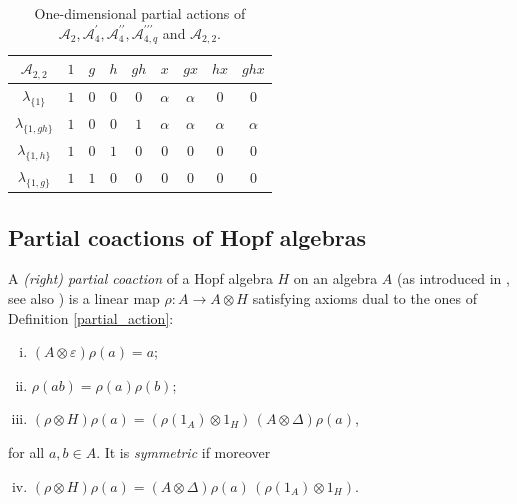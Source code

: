 \documentclass[reqno]{amsart}
\theoremstyle{definition}
\numberwithin{equation}{section}\theoremstyle{plain}
\theoremstyle{definition}
\begin{document}
\begin{center}
\begin{table}[!ht]
\vspace{0.2cm}           

\begin{tabular}{| c | c | c | c | c | c | c | c | c | }\hline
$\mathcal{A}_{2,2}$	& $1$ & $g$ & $h$ & $gh$ & $x$ & $gx$ & $hx$ & $ghx$	\\ \hline
$\lambda_{\{1\}}$ &  $1$ & $0$ & $0$  & $0$ & $\alpha$ & $\alpha$ & $0$ & $0$  \\ \hline
$\lambda_{\{1, gh\}}$ &  $1$ & $0$ & $0$ & $1$ & $\alpha$ &  $\alpha$ &  $\alpha$ &  $\alpha$ \\ \hline
$\lambda_{\{1, h\}}$ & $ 1$ & $0$ & $1$ & $0$ & $0$ & $0$ & $0$ & $0$  \\ \hline
$\lambda_{\{1, g\}}$ &  $1$ & $1$ & $0$ & $0$ & $0$ & $0$ & $0$ & $0$ \\ \hline    
\end{tabular}
            
\vspace{0.2cm}
            
\caption{One-dimensional partial actions of $\mathcal{A}_2, \mathcal{A}_4^\prime, \mathcal{A}_4^{\prime \prime}, \mathcal{A}_{4,q}^{\prime \prime \prime}$ and $ \mathcal{A}_{2,2}$.}
\label{table}
\end{table}
\end{center}
    


\subsection{Partial coactions of Hopf algebras}
\label{sec:parco}

    A \textit{(right) partial coaction}  of a Hopf algebra \(H\) on an algebra \(A\) (as introduced in \cite{caenepeel2008partial}, see also \cites{parcorep, BHSV}) is a linear map \(\rho : A \to A \otimes H\) satisfying axioms dual to the ones of Definition \ref{partial_action}: 
    \begin{enumerate}[(i)]
        \item \((A \otimes \varepsilon) \rho (a) = a\);
        \item \(\rho(ab) = \rho(a)\rho(b)\);
        \item \((\rho \otimes H) \rho(a) = (\rho(1_A) \otimes 1_H)\, (A \otimes \Delta)\rho(a)\),
    \end{enumerate}
    for all \(a, b \in A\). It is \textit{symmetric} if moreover
    \begin{enumerate}[(i)]
        \setcounter{enumi}{3}
        \item \((\rho \otimes H) \rho(a) =  (A \otimes \Delta)\rho(a)\, (\rho(1_A) \otimes 1_H)\).
    \end{enumerate}
\end{document}
